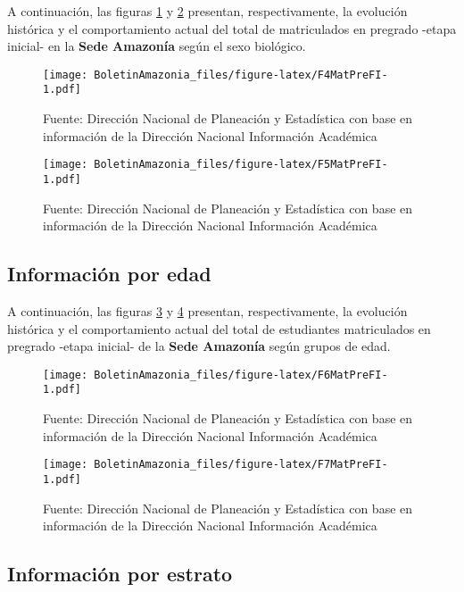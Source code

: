 \documentclass[
]{book}
\begin{document}
A continuación, las figuras \ref{fig:F4MatPreFI} y \ref{fig:F5MatPreFI} presentan, respectivamente, la evolución histórica y el comportamiento actual del total de matriculados en pregrado -etapa inicial- en la \textbf{Sede Amazonía} según el sexo biológico.

\begin{figure}
\centering
\texttt{[image: BoletinAmazonia\_files/figure-latex/F4MatPreFI-1.pdf]}
\caption{\label{fig:F4MatPreFI}Fuente: Dirección Nacional de Planeación y Estadística con base en información de la Dirección Nacional Información Académica}
\end{figure}

\begin{figure}
\centering
\texttt{[image: BoletinAmazonia\_files/figure-latex/F5MatPreFI-1.pdf]}
\caption{\label{fig:F5MatPreFI}Fuente: Dirección Nacional de Planeación y Estadística con base en información de la Dirección Nacional Información Académica}
\end{figure}

\hypertarget{informaciuxf3n-por-edad-5}{%
\subsection{Información por edad}\label{informaciuxf3n-por-edad-5}}

A continuación, las figuras \ref{fig:F6MatPreFI} y \ref{fig:F7MatPreFI} presentan, respectivamente, la evolución histórica y el comportamiento actual del total de estudiantes matriculados en pregrado -etapa inicial- de la \textbf{Sede Amazonía} según grupos de edad.

\begin{figure}
\centering
\texttt{[image: BoletinAmazonia\_files/figure-latex/F6MatPreFI-1.pdf]}
\caption{\label{fig:F6MatPreFI}Fuente: Dirección Nacional de Planeación y Estadística con base en información de la Dirección Nacional Información Académica}
\end{figure}

\begin{figure}
\centering
\texttt{[image: BoletinAmazonia\_files/figure-latex/F7MatPreFI-1.pdf]}
\caption{\label{fig:F7MatPreFI}Fuente: Dirección Nacional de Planeación y Estadística con base en información de la Dirección Nacional Información Académica}
\end{figure}

\hypertarget{informaciuxf3n-por-estrato-1}{%
\subsection{Información por estrato}\label{informaciuxf3n-por-estrato-1}}
\end{document}

